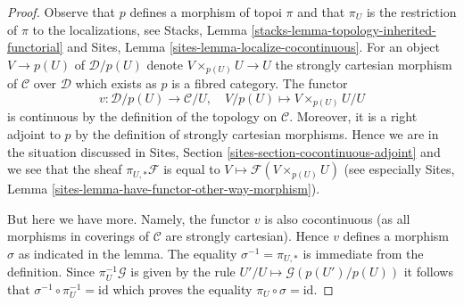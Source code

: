 \begin{proof}
Observe that $p$ defines a morphism of topoi $\pi$ and that $\pi_U$
is the restriction of $\pi$ to the localizations, see
Stacks, Lemma \ref{stacks-lemma-topology-inherited-functorial}
and
Sites, Lemma \ref{sites-lemma-localize-cocontinuous}.
For an object $V \to p(U)$ of $\mathcal{D}/p(U)$ denote
$V \times_{p(U)} U \to U$ the strongly cartesian morphism of $\mathcal{C}$
over $\mathcal{D}$ which exists as $p$ is a fibred category.
The functor
$$
v : \mathcal{D}/p(U) \to \mathcal{C}/U,\quad
V/p(U) \mapsto V \times_{p(U)} U/U
$$
is continuous by the definition of the topology on $\mathcal{C}$.
Moreover, it is a right adjoint to $p$ by the definition of strongly
cartesian morphisms. Hence we are in the situation discussed in
Sites, Section \ref{sites-section-cocontinuous-adjoint}
and we see that the sheaf $\pi_{U, *}\mathcal{F}$
is equal to $V \mapsto \mathcal{F}(V \times_{p(U)} U)$
(see especially Sites, Lemma
\ref{sites-lemma-have-functor-other-way-morphism}).

\medskip\noindent
But here we have more. Namely, the functor $v$
is also cocontinuous (as all morphisms in coverings of $\mathcal{C}$ 
are strongly cartesian). Hence $v$ defines a morphism $\sigma$ as
indicated in the lemma. The equality $\sigma^{-1} = \pi_{U, *}$
is immediate from the definition. Since $\pi_U^{-1}\mathcal{G}$
is given by the rule $U'/U \mapsto \mathcal{G}(p(U')/p(U))$
it follows that $\sigma^{-1} \circ \pi_U^{-1} = \text{id}$
which proves the equality
$\pi_U \circ \sigma = \text{id}$.
\end{proof}


